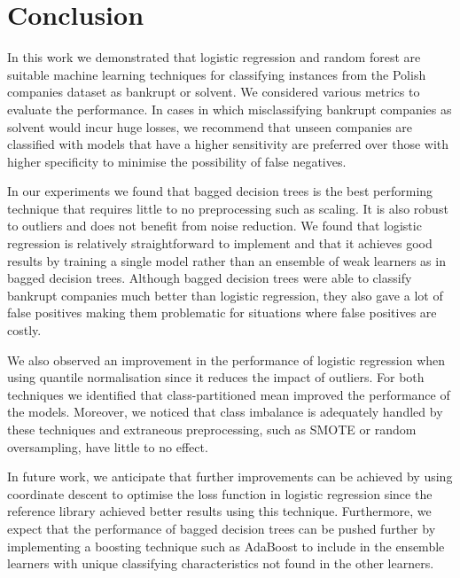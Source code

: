 \documentclass{article}[paper=a4,pagesize=auto,10pt]
\begin{document}

\section{Conclusion}
\label{Conclusion}

In this work we demonstrated that logistic regression and random
forest are suitable machine learning techniques for classifying
instances from the Polish companies dataset as bankrupt or solvent. We
considered various metrics to evaluate the performance. In cases in
which misclassifying bankrupt companies as solvent would incur huge
losses, we recommend that unseen companies are classified with models
that have a higher sensitivity are
preferred over those with higher specificity to minimise the possibility of false
negatives.\medskip

In our experiments we found that bagged decision trees is the best performing
technique that requires little to no preprocessing such as scaling.
It is also robust to outliers and does not benefit from noise
reduction. We found that logistic regression is relatively
straightforward to implement and that it achieves good results by
training a single model rather than an ensemble of weak learners as in
bagged decision trees. Although bagged decision trees were able to classify bankrupt companies much better than logistic regression, they also gave a lot of false positives making them problematic for situations where false positives are costly. \medskip

We also observed an improvement in the performance of
logistic regression when using quantile normalisation since it reduces
the impact of outliers. For both techniques we identified that
class-partitioned mean improved the performance of the models. Moreover, we noticed that class imbalance
is adequately handled by these techniques and extraneous
preprocessing, such as SMOTE or random oversampling, have little to no
effect.\medskip

In future work, we anticipate that further improvements can be
achieved by using coordinate descent to optimise the loss function in
logistic regression since the reference library achieved better results using this technique. Furthermore, we expect that the performance of bagged decision trees can be pushed further
by implementing a boosting technique such as AdaBoost to include in
the ensemble learners with unique classifying characteristics not
found in the other learners.




\end{document}
